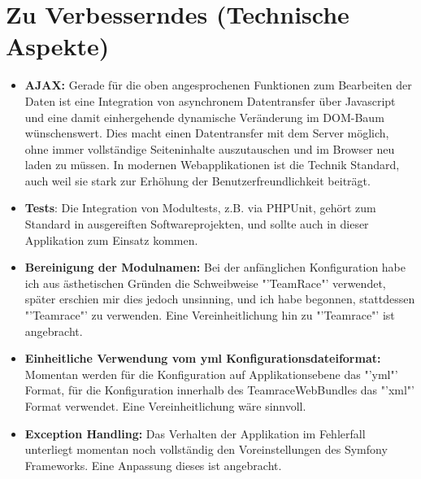 \documentclass[12pt]{report}
\begin{document}
\section{Zu Verbesserndes (Technische Aspekte)}
\label{sec:AJAX}

\begin{itemize}
\item{\textbf{AJAX:} Gerade für die oben angesprochenen Funktionen zum Bearbeiten der Daten ist eine Integration von asynchronem Datentransfer über Javascript und eine damit einhergehende dynamische Veränderung im DOM-Baum wünschenswert. Dies macht einen Datentransfer mit dem Server möglich, ohne immer vollständige Seiteninhalte auszutauschen und im Browser neu laden zu müssen. In modernen Webapplikationen ist die Technik Standard, auch weil sie stark zur Erhöhung der Benutzerfreundlichkeit beiträgt. }
\item{\textbf{Tests}: Die Integration von Modultests, z.B. via PHPUnit, gehört zum Standard in ausgereiften Softwareprojekten, und sollte auch in dieser Applikation zum Einsatz kommen. }
\item{\textbf{Bereinigung der Modulnamen:} Bei der anfänglichen Konfiguration habe ich aus ästhetischen Gründen die Schweibweise "'TeamRace"' verwendet, später erschien mir dies jedoch unsinning, und ich habe begonnen, stattdessen "'Teamrace"' zu verwenden. Eine Vereinheitlichung hin zu "'Teamrace"' ist angebracht.}
\item{\textbf{Einheitliche Verwendung vom yml Konfigurationsdateiformat:} Momentan werden für die Konfiguration auf Applikationsebene das "'yml"' Format, für die Konfiguration innerhalb des TeamraceWebBundles das "'xml"' Format verwendet. Eine Vereinheitlichung wäre sinnvoll.}

\item{\textbf{Exception Handling:} Das Verhalten der Applikation im Fehlerfall unterliegt momentan noch vollständig den Voreinstellungen des Symfony Frameworks. Eine Anpassung dieses ist angebracht.}

\end{itemize}




\end{document}
